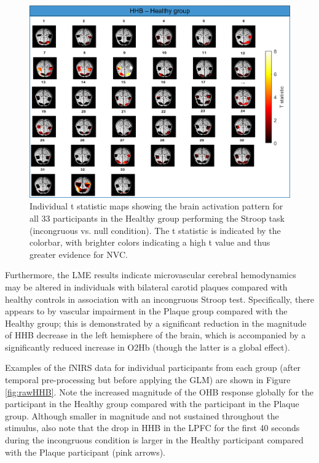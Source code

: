 \documentclass[12pt]{spieman}  %
\begin{document}
\begin{spacing}{2}
\begin{figure}
\begin{center}
\includegraphics[width = \linewidth]{Fig4_revised_individualResults.jpg}
\end{center}
\caption 
{\label{fig:individualResults} Individual t statistic maps showing the brain activation pattern for all 33 participants in the Healthy group performing the Stroop task (incongruous vs. null condition). The t statistic is indicated by the colorbar, with brighter colors indicating a high t value and thus greater evidence for NVC.} 
\end{figure} 

Furthermore, the LME results indicate microvascular cerebral hemodynamics may be altered in individuals with bilateral carotid plaques compared with healthy controls in association with an incongruous Stroop test. Specifically, there appears to by vascular impairment in the Plaque group compared with the Healthy group; this is demonstrated by a significant reduction in the magnitude of HHB decrease in the left hemisphere of the brain, which is accompanied by a significantly reduced increase in O2Hb (though the latter is a global effect). 

Examples of the fNIRS data for individual participants from each group (after temporal pre-processing but before applying the GLM) are shown in Figure \ref{fig:rawHHB}. Note the increased magnitude of the OHB response globally for the participant in the Healthy group compared with the participant in the Plaque group. Although smaller in magnitude and not sustained throughout the stimulus, also note that the drop in HHB in the LPFC for the first 40 seconds during the incongruous condition is larger in the Healthy participant compared with the Plaque participant (pink arrows). 


\end{spacing}
\end{document}
